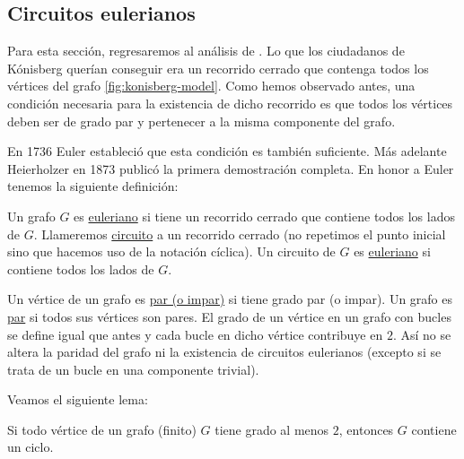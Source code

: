 \subsection{Circuitos eulerianos}

Para esta sección, regresaremos al análisis de . Lo que los ciudadanos de Kónisberg querían conseguir era un recorrido cerrado que contenga todos los vértices del grafo \ref{fig:konisberg-model}. Como hemos observado antes, una condición necesaria para la existencia de dicho recorrido es que todos los vértices deben ser de grado par y pertenecer a la misma componente del grafo.

En 1736 Euler estableció que esta condición es también suficiente. Más adelante Heierholzer en 1873 publicó la primera demostración completa. En honor a Euler tenemos la siguiente definición:

\begin{defn}
    Un grafo $G$ es \ul{euleriano} si tiene un recorrido cerrado que contiene todos los lados de $G$. Llameremos \ul{circuito} a un recorrido cerrado (no repetimos el punto inicial sino que hacemos uso de la notación cíclica). Un circuito de $G$ es \ul{euleriano} si contiene todos los lados de $G$.
    
    Un vértice de un grafo es \ul{par (o impar)} si tiene grado par (o impar). Un grafo es \ul{par} si todos sus vértices son pares. El grado de un vértice en un grafo con bucles se define igual que antes y cada bucle en dicho vértice contribuye en $2$. Así no se altera la paridad del grafo ni la existencia de circuitos eulerianos (excepto si se trata de un bucle en una componente trivial).
\end{defn}

Veamos el siguiente lema:

\begin{lem}\label{lem:2.3.1}
    Si todo vértice de un grafo (finito) $G$ tiene grado al menos $2$, entonces $G$ contiene un ciclo.
\end{lem}

